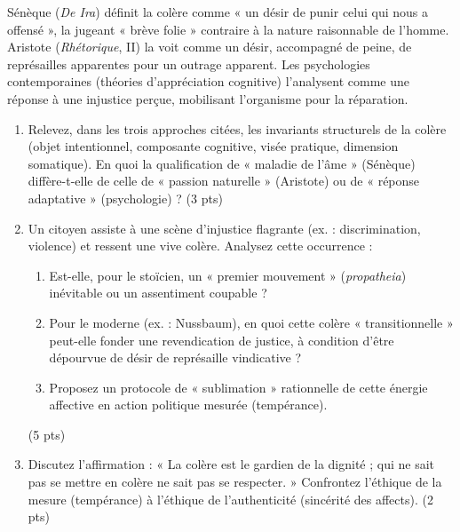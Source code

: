 \documentclass[11pt]{article}
\begin{document}
\begin{exercice}
Sénèque (\textit{De Ira}) définit la colère comme « un désir de punir celui qui nous a offensé », la jugeant « brève folie » contraire à la nature raisonnable de l'homme. Aristote (\textit{Rhétorique}, II) la voit comme un désir, accompagné de peine, de représailles apparentes pour un outrage apparent. Les psychologies contemporaines (théories d'appréciation cognitive) l'analysent comme une réponse à une injustice perçue, mobilisant l'organisme pour la réparation.
\begin{enumerate}
    \item Relevez, dans les trois approches citées, les invariants structurels de la colère (objet intentionnel, composante cognitive, visée pratique, dimension somatique). En quoi la qualification de « maladie de l'âme » (Sénèque) diffère-t-elle de celle de « passion naturelle » (Aristote) ou de « réponse adaptative » (psychologie) ? (3 pts)
    \item Un citoyen assiste à une scène d'injustice flagrante (ex. : discrimination, violence) et ressent une vive colère. Analysez cette occurrence : 
    \begin{enumerate}
        \item Est-elle, pour le stoïcien, un « premier mouvement » (\textit{propatheia}) inévitable ou un assentiment coupable ? 
        \item Pour le moderne (ex. : Nussbaum), en quoi cette colère « transitionnelle » peut-elle fonder une revendication de justice, à condition d'être dépourvue de désir de représaille vindicative ? 
        \item Proposez un protocole de « sublimation » rationnelle de cette énergie affective en action politique mesurée (tempérance). 
    \end{enumerate}
    (5 pts)
    \item Discutez l'affirmation : « La colère est le gardien de la dignité ; qui ne sait pas se mettre en colère ne sait pas se respecter. » Confrontez l'éthique de la mesure (tempérance) à l'éthique de l'authenticité (sincérité des affects). (2 pts)
\end{enumerate}
\end{exercice}
\end{document}
